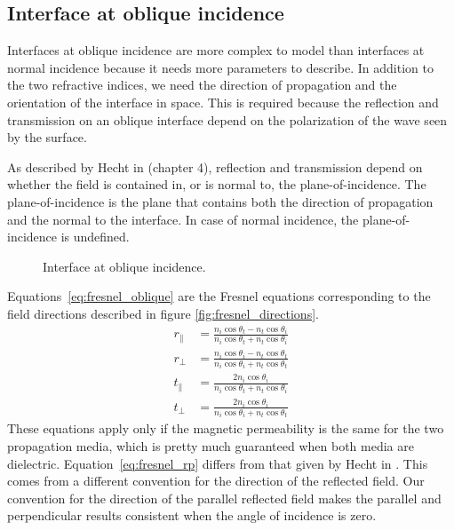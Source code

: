 
\subsection{Interface at oblique incidence}
Interfaces at oblique incidence are more complex to model than interfaces at normal incidence because it needs more parameters to describe.
In addition to the two refractive indices, we need the direction of propagation and the orientation of the interface in space.
This is required because the reflection and transmission on an oblique interface depend on the polarization of the wave seen by the surface.

As described by Hecht in \cite{hecht2002optics} (chapter 4), reflection and transmission depend on whether the field is contained in, or is normal to, the plane-of-incidence.
The plane-of-incidence is the plane that contains both the direction of propagation and the normal to the interface.
In case of normal incidence, the plane-of-incidence is undefined.

\begin{figure}[hbtp]
    \centering
    \caption{\label{fig:net_interface_oblique}Interface at oblique incidence.}
\end{figure}
Equations~\eqref{eq:fresnel_oblique} are the Fresnel equations corresponding to the field directions described in figure \ref{fig:fresnel_directions}.
\begin{subequations}
    \begin{align}
        r_\parallel & =
        \frac{n_i \cos \theta_t - n_t \cos \theta_i}{n_i \cos \theta_t + n_t \cos \theta_i}
        \label{eq:fresnel_rp}
        \\
        r_\perp & =
        \frac{n_i \cos \theta_i - n_t \cos \theta_t}{n_i \cos \theta_i + n_t \cos \theta_t}
        \label{eq:fresnel_rs}
        \\
        t_\parallel & =
        \frac {2 n_i \cos \theta_i}{n_i \cos \theta_t + n_t \cos \theta_i}
        \label{eq:fresnel_tp}
        \\
        t_\perp & =
        \frac {2 n_i \cos \theta_i}{n_i \cos \theta_i + n_t \cos \theta_t}
        \label{eq:fresnel_ts}
    \end{align}
    \label{eq:fresnel_oblique}
\end{subequations}
These equations apply only if the magnetic permeability is the same for the two propagation media, which is pretty much guaranteed when both media are dielectric.
Equation~\eqref{eq:fresnel_rp} differs from that given by Hecht in \cite{hecht2002optics}.
This comes from a different convention for the direction of the reflected field.
Our convention for the direction of the parallel reflected field makes the parallel and perpendicular results consistent when the angle of incidence is zero.

